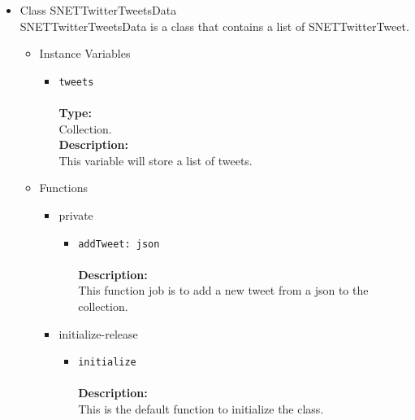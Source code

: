 \begin{itemize}

\item Class SNETTwitterTweetsData\\
\label{sec-1-4-2-1}%
SNETTwitterTweetsData is a class that contains a list of SNETTwitterTweet.

\begin{itemize}

\item Instance Variables
\label{sec-1-4-2-1-1}%
\begin{itemize}
\item \verb~tweets~\\\\
\textbf{Type:}\\
     Collection.\\

     \textbf{Description:}\\
     This variable will store a list of tweets.
\end{itemize}


\item Functions
\label{sec-1-4-2-1-2}%
\begin{itemize}

\item private
\label{sec-1-4-2-1-2-1}%
\begin{itemize}
\item \verb~addTweet: json~\\\\
\textbf{Description:}\\
      This function job is to add a new tweet from a json to the collection.\\
\end{itemize}


\item initialize-release
\label{sec-1-4-2-1-2-2}%
\begin{itemize}
\item \verb~initialize~\\\\
\textbf{Description:}\\
      This is the default function to initialize the class.
\end{itemize}



\end{itemize}
\end{itemize}
\end{itemize}
